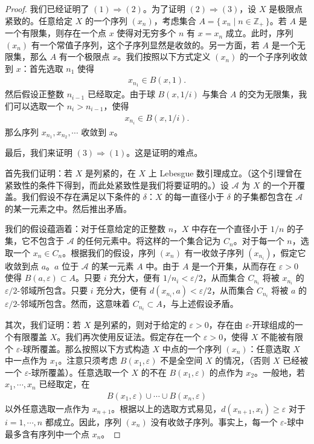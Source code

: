 \begin{proof}
我们已经证明了 $(1)\Rightarrow(2)$。为了证明 $(2)\Rightarrow(3)$，设 $X$ 是极限点紧致的。任意给定 $X$ 的一个序列 $(x_{n})$，考虑集合 $A=\{\,x_{n}\mid n\in\mathbb{Z}_{+}\,\}$。若 $A$ 是一个有限集，则存在一个点 $x$ 使得对无穷多个 $n$ 有 $x=x_{n}$ 成立。此时，序列 $(x_{n})$ 有一个常值子序列，这个子序列显然是收敛的。另一方面，若 $A$ 是一个无限集，那么 $A$ 有一个极限点 $x$。我们按照以下方式定义 $(x_{n})$ 的一个子序列收敛到 $x$：首先选取 $n_{1}$ 使得
\begin{align*}
x_{n_{1}}\in B(x,1).
\end{align*}
然后假设正整数 $n_{i-1}$ 已经取定。由于球 $B(x,1/i)$ 与集合 $A$ 的交为无限集，我们可以选取一个 $n_{i}>n_{i-1}$，使得
\begin{align*}
x_{n_{i}}\in B(x,1/i).
\end{align*}
那么序列 $x_{n_{1}},x_{n_{2}},\cdots$ 收敛到 $x$。

最后，我们来证明 $(3)\Rightarrow(1)$。这是证明的难点。

首先我们证明：若 $X$ 是列紧的，在 $X$ 上 Lebesgue 数引理成立。（这个引理曾在紧致性的条件下得到，而此处紧致性是我们将要证明的。）设 $\mathcal{A}$ 为 $X$ 的一个开覆盖。我们假设不存在满足以下条件的 $\delta$：$X$ 的每一直径小于 $\delta$ 的子集都包含在 $\mathcal{A}$ 的某一元素之中。然后推出矛盾。

我们的假设蕴涵着：对于任意给定的正整数 $n$，$X$ 中存在一个直径小于 $1/n$ 的子集，它不包含于 $\mathcal{A}$ 的任何元素中。将这样的一个集合记为 $C_{n}$。对于每一个 $n$，选取一个 $x_{n}\in C_{n}$。根据我们的假设，序列 $(x_{n})$ 有一收敛子序列 $(x_{n_{i}})$，假定它收敛到点 $a$。$a$ 位于 $\mathcal{A}$ 的某一元素 $A$ 中。由于 $A$ 是一个开集，从而存在 $\varepsilon>0$ 使得 $B(a,\varepsilon)\subset A$。只要 $i$ 充分大，便有 $1/n_{i}<\varepsilon/2$，从而集合 $C_{n_{i}}$ 将被 $x_{n_{i}}$ 的 $\varepsilon/2$-邻域所包含。只要 $i$ 充分大，便有 $d(x_{n_{i}},a)<\varepsilon/2$，从而集合 $C_{n_{i}}$ 将被 $a$ 的 $\varepsilon/2$-邻域所包含。然而，这意味着 $C_{n_{i}}\subset A$，与上述假设矛盾。

其次，我们证明：若 $X$ 是列紧的，则对于给定的 $\varepsilon>0$，存在由 $\varepsilon$-开球组成的一个有限覆盖 $X$。我们再次使用反证法。假定存在一个 $\varepsilon>0$，使得 $X$ 不能被有限个 $\varepsilon$-球所覆盖。那么按照以下方式构造 $X$ 中点的一个序列 $(x_{n})$：任意选取 $X$ 中一点作为 $x_{1}$。注意只须考虑 $B(x_{1},\varepsilon)$ 不是全空间 $X$ 的情况，（否则 $X$ 已经被一个 $\varepsilon$-球所覆盖）。任意选取一个 $X$ 的不在 $B(x_{1},\varepsilon)$ 的点作为 $x_{2}$。一般地，若 $x_{1},\cdots,x_{n}$ 已经取定，在
\begin{align*}
B(x_{1},\varepsilon)\cup\cdots\cup B(x_{n},\varepsilon)
\end{align*}
以外任意选取一点作为 $x_{n+1}$。根据以上的选取方式易见，$d(x_{n+1},x_{i})\geqslant\varepsilon$ 对于 $i=1,\cdots,n$ 都成立。因此，序列 $(x_{n})$ 没有收敛子序列。事实上，每一个 $\varepsilon$-球中最多含有序列中一个点 $x_{n}$。


\end{proof}
